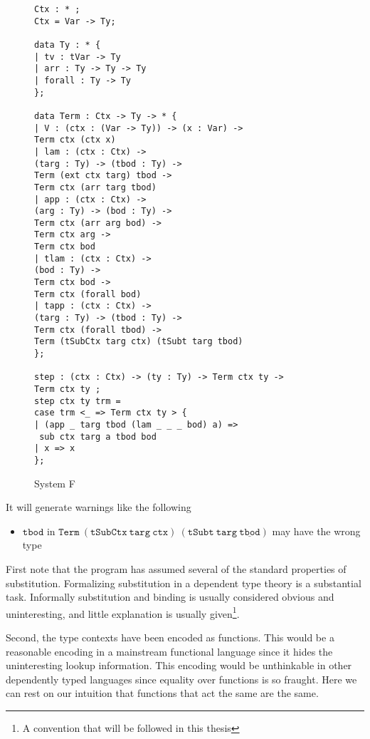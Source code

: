 \begin{figure}
\begin{lstlisting}[basicstyle={\ttfamily\tiny}]
Ctx : * ;
Ctx = Var -> Ty;

data Ty : * {
| tv : tVar -> Ty
| arr : Ty -> Ty -> Ty
| forall : Ty -> Ty
};

data Term : Ctx -> Ty -> * {
| V : (ctx : (Var -> Ty)) -> (x : Var) ->
Term ctx (ctx x)
| lam : (ctx : Ctx) ->
(targ : Ty) -> (tbod : Ty) ->
Term (ext ctx targ) tbod ->
Term ctx (arr targ tbod)
| app : (ctx : Ctx) ->
(arg : Ty) -> (bod : Ty) ->
Term ctx (arr arg bod) ->
Term ctx arg ->
Term ctx bod
| tlam : (ctx : Ctx) ->
(bod : Ty) ->
Term ctx bod ->
Term ctx (forall bod)
| tapp : (ctx : Ctx) ->
(targ : Ty) -> (tbod : Ty) ->
Term ctx (forall tbod) ->
Term (tSubCtx targ ctx) (tSubt targ tbod)
};

step : (ctx : Ctx) -> (ty : Ty) -> Term ctx ty ->
Term ctx ty ;
step ctx ty trm =
case trm <_ => Term ctx ty > {
| (app _ targ tbod (lam _ _ _ bod) a) =>
 sub ctx targ a tbod bod
| x => x
};
\end{lstlisting}

\caption{System F}
\label{fig:ex-sysf}
\end{figure}

It will generate warnings like the following
\begin{itemize}
\item $\mathtt{tbod}$ in $\mathtt{Term\ (tSubCtx\ targ\ ctx)\ (tSubt\ targ\ \underline{tbod})}$
may have the wrong type
\end{itemize}
First note that the program has assumed several of the standard properties of substitution.
Formalizing substitution in a dependent type theory is a substantial
task\cite{10.1145/3293880.3294101}.
Informally substitution and binding is usually considered obvious and uninteresting, and little explanation is usually given\footnote{A convention that will be followed in this thesis}.

Second, the type contexts have been encoded as functions.
This would be a reasonable encoding in a mainstream functional language since it hides the uninteresting lookup information.
This encoding would be unthinkable in other dependently typed languages since equality over functions is so fraught.
Here we can rest on our intuition that functions that act the same are the same.

